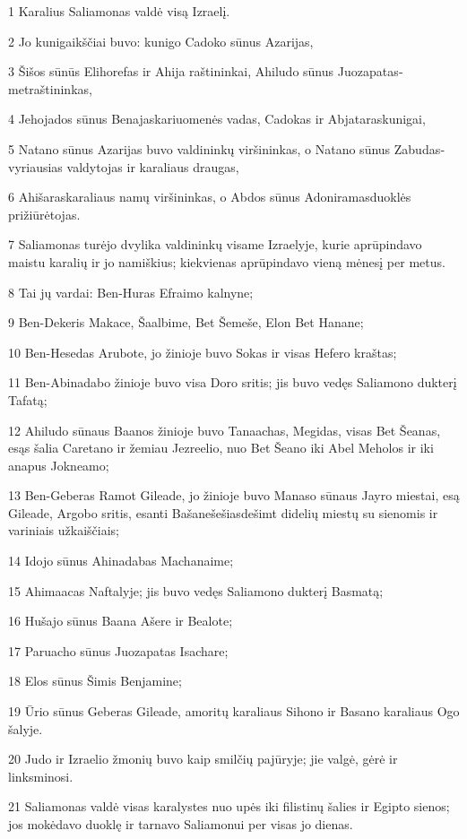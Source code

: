 \par 1 Karalius Saliamonas valdė visą Izraelį. 
\par 2 Jo kunigaikščiai buvo: kunigo Cadoko sūnus Azarijas, 
\par 3 Šišos sūnūs Elihorefas ir Ahija­ raštininkai, Ahiludo sūnus Juozapatas­metraštininkas, 
\par 4 Jehojados sūnus Benajas­kariuomenės vadas, Cadokas ir Abjataras­kunigai, 
\par 5 Natano sūnus Azarijas buvo valdininkų viršininkas, o Natano sūnus Zabudas­vyriausias valdytojas ir karaliaus draugas, 
\par 6 Ahišaras­karaliaus namų viršininkas, o Abdos sūnus Adoniramas­duoklės prižiūrėtojas. 
\par 7 Saliamonas turėjo dvylika valdininkų visame Izraelyje, kurie aprūpindavo maistu karalių ir jo namiškius; kiekvienas aprūpindavo vieną mėnesį per metus. 
\par 8 Tai jų vardai: Ben-Huras Efraimo kalnyne; 
\par 9 Ben-Dekeris Makace, Šaalbime, Bet Šemeše, Elon Bet Hanane; 
\par 10 Ben-Hesedas Arubote, jo žinioje buvo Sokas ir visas Hefero kraštas; 
\par 11 Ben-Abinadabo žinioje buvo visa Doro sritis; jis buvo vedęs Saliamono dukterį Tafatą; 
\par 12 Ahiludo sūnaus Baanos žinioje buvo Tanaachas, Megidas, visas Bet Šeanas, esąs šalia Caretano ir žemiau Jezreelio, nuo Bet Šeano iki Abel Meholos ir iki anapus Jokneamo; 
\par 13 Ben-Geberas Ramot Gileade, jo žinioje buvo Manaso sūnaus Jayro miestai, esą Gileade, Argobo sritis, esanti Bašane­šešiasdešimt didelių miestų su sienomis ir variniais užkaiščiais; 
\par 14 Idojo sūnus Ahinadabas Machanaime; 
\par 15 Ahimaacas Naftalyje; jis buvo vedęs Saliamono dukterį Basmatą; 
\par 16 Hušajo sūnus Baana Ašere ir Bealote; 
\par 17 Paruacho sūnus Juozapatas Isachare; 
\par 18 Elos sūnus Šimis Benjamine; 
\par 19 Ūrio sūnus Geberas Gileade, amoritų karaliaus Sihono ir Basano karaliaus Ogo šalyje. 
\par 20 Judo ir Izraelio žmonių buvo kaip smilčių pajūryje; jie valgė, gėrė ir linksminosi. 
\par 21 Saliamonas valdė visas karalystes nuo upės iki filistinų šalies ir Egipto sienos; jos mokėdavo duoklę ir tarnavo Saliamonui per visas jo dienas. 
